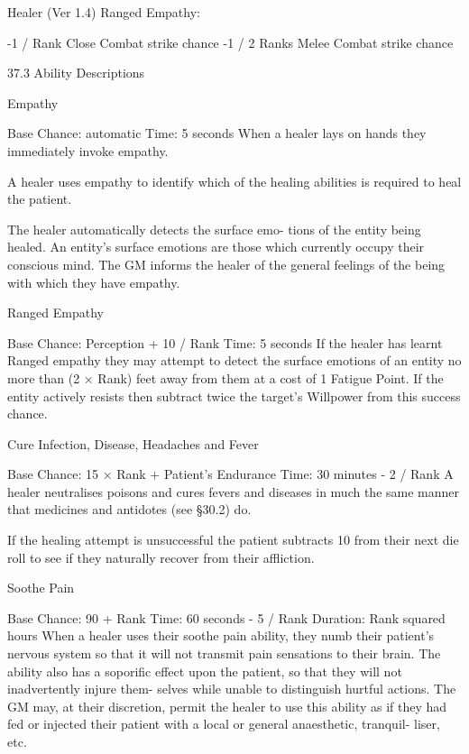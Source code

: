 \begin{Chapter}{Healer (Ver 1.4)}
Ranged Empathy: 

-1 / Rank 
Close Combat strike chance 
-1 / 2 Ranks  Melee Combat strike chance 

37.3 Ability Descriptions 

Empathy 

Base Chance: automatic 
Time: 5 seconds 
When  a  healer  lays  on  hands  they  immediately 
invoke empathy. 

A  healer  uses  empathy  to  identify  which  of  the 
healing abilities is required to heal the patient. 

The  healer  automatically  detects  the  surface  emo-
tions of the entity being healed. An entity’s surface 
emotions  are  those  which  currently  occupy  their 
conscious mind. The GM informs the healer of the 
general feelings of the being with which they have 
empathy. 

Ranged Empathy 

Base Chance: Perception + 10 / Rank 
Time: 5 seconds 
If  the  healer  has  learnt  Ranged  empathy  they  may 
attempt to detect the surface emotions of an entity 
no more than (2 × Rank) feet away from them at a 
cost of 1 Fatigue Point. If the entity actively resists 
then  subtract  twice  the  target’s  Willpower  from 
this success chance. 

Cure Infection, Disease, Headaches and 
Fever 

Base Chance: 15 × Rank + Patient’s Endurance 
Time: 30 minutes - 2 / Rank 
A  healer  neutralises  poisons  and  cures  fevers  and 
diseases  in  much  the  same  manner  that  medicines 
and antidotes (see §30.2) do. 

If  the  healing  attempt  is  unsuccessful  the  patient 
subtracts  10  from  their  next  die  roll  to  see  if  they 
naturally recover from their affliction. 

Soothe Pain 

Base Chance: 90 + Rank  
Time: 60 seconds - 5 / Rank 
Duration: Rank squared hours 
When  a  healer  uses  their  soothe  pain  ability,  they 
numb their patient’s nervous system so that it will 
not  transmit  pain  sensations  to  their  brain.  The 
ability  also  has  a  soporific  effect upon the patient, 
so  that  they  will  not  inadvertently  injure  them-
selves  while  unable  to  distinguish  hurtful  actions. 
The GM may, at their discretion, permit the healer 
to use this ability as if they had fed or injected their 
patient with a local or general anaesthetic, tranquil-
liser, etc. 


\end{Chapter}
